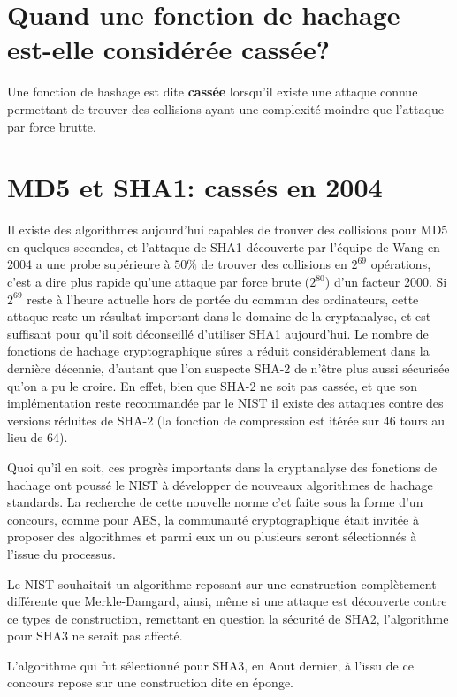 \documentclass[10.5pt, a4paper, twoside, openright]{report}
\begin{document}
\section{Quand une fonction de hachage est-elle considérée cassée?}
Une fonction de hashage est dite \textbf{cassée} lorsqu'il existe une attaque connue permettant de trouver des collisions ayant une complexité moindre que l'attaque par force brutte. 

\section{MD5 et SHA1: cassés en 2004}
Il existe des algorithmes aujourd’hui capables de trouver des collisions pour MD5 en quelques secondes, et l’attaque de SHA1 découverte par l’équipe de Wang en 2004 a une probe supérieure à $50\%$ de trouver des collisions en $2^{69}$ opérations, c’est a dire plus rapide qu’une attaque par force brute ($2^80$) d’un facteur 2000.
Si $2^{69}$ reste à l’heure actuelle hors de portée du commun des ordinateurs, cette attaque reste un résultat important dans le domaine de la cryptanalyse, et est suffisant pour qu’il soit déconseillé d’utiliser SHA1 aujourd’hui.
Le nombre de fonctions de hachage cryptographique sûres a réduit considérablement dans la dernière décennie, d’autant que l’on suspecte SHA-2 de n’être plus aussi sécurisée qu’on a pu le croire. En effet, bien que SHA-2 ne soit pas cassée, et que son implémentation reste recommandée par le NIST il existe des attaques contre des versions réduites de SHA-2 (la fonction de compression est itérée sur 46 tours au lieu de 64).

Quoi qu'il en soit, ces progrès importants dans la cryptanalyse des fonctions de hachage ont poussé le NIST à développer de nouveaux algorithmes de hachage standards. La recherche de cette nouvelle norme c'et faite sous la forme d'un concours, comme pour AES, la communauté cryptographique était invitée à proposer des algorithmes et parmi eux un ou plusieurs seront sélectionnés à l’issue du processus.

Le NIST souhaitait un algorithme reposant sur une construction complètement différente que Merkle-Damgard, ainsi, même si une attaque est découverte contre ce types de construction, remettant en question la sécurité de SHA2, l'algorithme pour SHA3 ne serait pas affecté.
 
L'algorithme qui fut sélectionné pour SHA3, en Aout dernier, à l'issu de ce concours repose sur une construction dite en éponge. 
\end{document}
